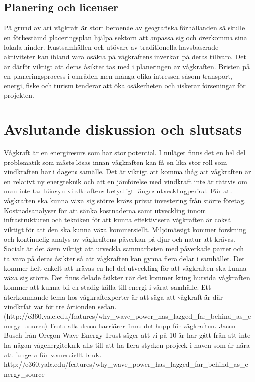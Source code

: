 \documentclass[10pt,a4paper,oneside]{article}
\begin{document}
\subsection{Planering och licenser}
På grund av att vågkraft är stort beroende av geografiska förhållanden så skulle en förbestämd placeringsplan hjälpa sektorn att anpassa sig och överkomma sina lokala hinder. Kustsamhällen och utövare av traditionella havsbaserade aktiviteter kan ibland vara osäkra på vågkraftens inverkan på deras tillvaro. Det är därför viktigt att deras åsikter tas med i planeringen av vågkraften. Bristen på en planeringsprocess i områden men många olika intressen såsom transport, energi, fiske och turism tenderar att öka osäkerheten och riskerar förseningar för projekten. 


\section{Avslutande diskussion och slutsats}
Vågkraft är en energiresurs som har stor potential. I nuläget finns det en hel del problematik som måste lösas innan vågkraften kan få en lika stor roll som vindkraften har i dagens samälle. 
Det är viktigt att komma ihåg att vågkraften är en relativt ny energteknik och att en jämförelse med vindkraft inte är rättvis om man inte tar hänsyn vindkraftens betydligt längre utvecklingperiod. För att vågkraften ska kunna växa sig större krävs privat investering från större företag. Kostnadsanalyser för att sänka kostnaderna samt utveckling innom infrastrukturen och tekniken för att kunna effektivisera vågkraften är cokså viktigt för att den ska kunna växa kommersiellt. Miljömässigt kommer forskning och kontinuelig analys av vågkraftens påverkan på djur och natur att krävas. Socialt är det även viktigt att utveckla sammarbeten med påverkade parter och ta vara på deras åsikter så att vågkraften kan gynna flera delar i samhället. Det kommer helt enkelt att krävas en hel del utveckling för att vågkraften ska kunna växa sig större. Det finns delade åsikter när det kommer kring hurvida vågkraften kommer att kunna bli en stadig källa till energi i vårat samhälle. Ett återkommande tema hos vågkraftexperter är att säga att vågkraft är där vindkrfat var för tre årtionden sedan.(http://e360.yale.edu/features/why_wave_power_has_lagged_far_behind_as_energy_source)   Trots alla dessa barriärer finns det hopp för vågkraften. Jason Busch från Oregon Wave Energy Trust säger att vi på 10 år har gått från att inte ha någon vågenergiteknik alls till att ha flera stycken projeck i haven som är nära att fungera för komerciellt bruk. http://e360.yale.edu/features/why_wave_power_has_lagged_far_behind_as_energy_source   
 \newpage
\end{document}
